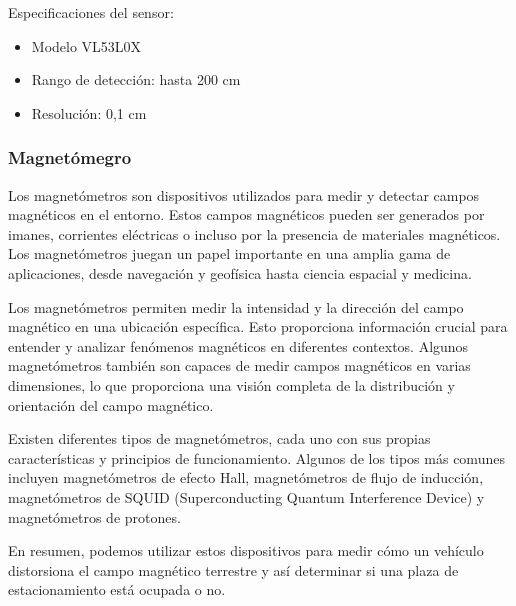 Especificaciones del sensor:
\begin{itemize}
    \item Modelo VL53L0X
    \item Rango de detección: hasta 200 cm
    \item Resolución: 0,1 cm
\end{itemize}


\subsubsection{Magnetómegro}
Los magnetómetros son dispositivos utilizados para medir y detectar campos magnéticos en el entorno. Estos campos magnéticos pueden ser generados por imanes, corrientes eléctricas o incluso por la presencia de materiales magnéticos. Los magnetómetros juegan un papel importante en una amplia gama de aplicaciones, desde navegación y geofísica hasta ciencia espacial y medicina.

Los magnetómetros permiten medir la intensidad y la dirección del campo magnético en una ubicación específica. Esto proporciona información crucial para entender y analizar fenómenos magnéticos en diferentes contextos. Algunos magnetómetros también son capaces de medir campos magnéticos en varias dimensiones, lo que proporciona una visión completa de la distribución y orientación del campo magnético.

Existen diferentes tipos de magnetómetros, cada uno con sus propias características y principios de funcionamiento. Algunos de los tipos más comunes incluyen magnetómetros de efecto Hall, magnetómetros de flujo de inducción, magnetómetros de SQUID (Superconducting Quantum Interference Device) y magnetómetros de protones.

En resumen, podemos utilizar estos dispositivos para medir cómo un vehículo distorsiona el campo magnético terrestre y así determinar si una plaza de estacionamiento está ocupada o no.


